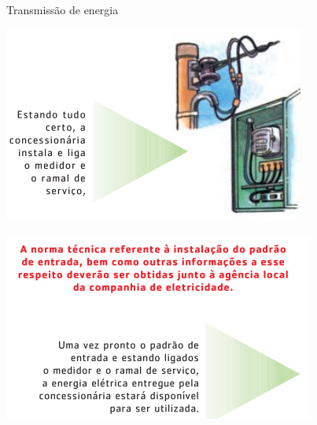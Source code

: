 \begin{frame}{Transmissão de energia}
	\begin{minipage}{0.49\linewidth}
		\centering
		\includegraphics[width=\linewidth]{Figuras/Ch03/fig21.1}
	\end{minipage}\hfill
	\begin{minipage}{0.49\linewidth}
		\centering
		\includegraphics[width=\linewidth]{Figuras/Ch03/fig21}
	\end{minipage}

\end{frame}


